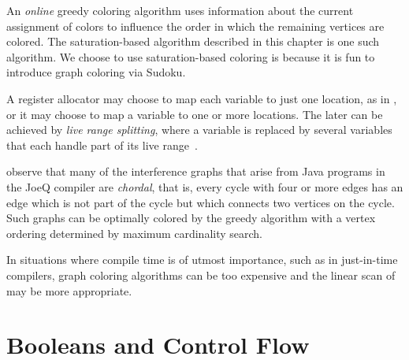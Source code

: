 \documentclass[11pt]{book}
\begin{document}
{An \emph{online} greedy coloring algorithm uses information about the
current assignment of colors to influence the order in which the
remaining vertices are colored. The saturation-based algorithm
described in this chapter is one such algorithm. We choose to use
saturation-based coloring is because it is fun to introduce graph
coloring via Sudoku.

A register allocator may choose to map each variable to just one
location, as in \citet{Chaitin:1981vl}, or it may choose to map a
variable to one or more locations. The later can be achieved by
\emph{live range splitting}, where a variable is replaced by several
variables that each handle part of its live
range~\citep{Chow:1984ys,Briggs:1994kx,Cooper:1998ly}.






\citet{Palsberg:2007si} observe that many of the interference graphs
that arise from Java programs in the JoeQ compiler are \emph{chordal},
that is, every cycle with four or more edges has an edge which is not
part of the cycle but which connects two vertices on the cycle. Such
graphs can be optimally colored by the greedy algorithm with a vertex
ordering determined by maximum cardinality search.

In situations where compile time is of utmost importance, such as in
just-in-time compilers, graph coloring algorithms can be too expensive
and the linear scan of \citet{Poletto:1999uq} may be more appropriate.


\chapter{Booleans and Control Flow}
\label{ch:Rif}

}
\end{document}
